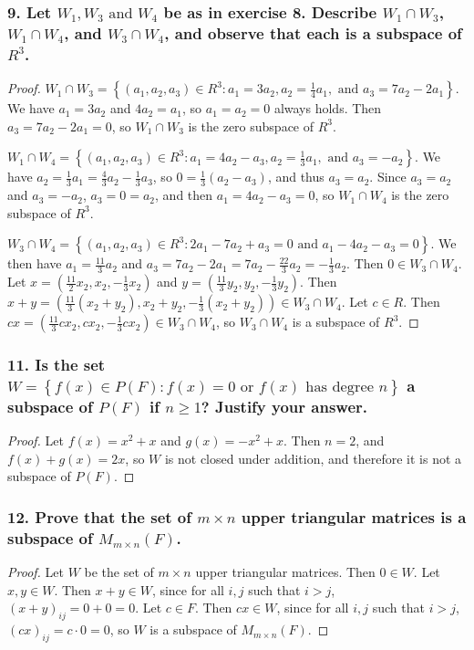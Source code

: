 \documentclass{article}
\begin{document}
\subsubsection*{9. Let $W_1, W_3 \text{ and } W_4$ be as in exercise 8. Describe $W_1 \cap W_3$, $W_1 \cap W_4$, and $W_3 \cap W_4$, and observe that each is a subspace of $R^3$.}
\begin{proof}
	$W_1 \cap W_3 = \left\{(a_1, a_2, a_3) \in R^3: a_1 = 3a_2, a_2 = \frac{1}{4}a_1,\text{ and } a_3 = 7a_2 - 2a_1\right\}$. We have $a_1 = 3a_2$ and $4a_2 = a_1$, so $a_1 = a_2 = 0$ always holds. Then $a_3 = 7a_2 - 2a_1 = 0$, so $W_1 \cap W_3$ is the zero subspace of $R^3$.
	
	$W_1 \cap W_4 = \left\{(a_1, a_2, a_3) \in R^3: a_1 = 4a_2-a_3, a_2 = \frac{1}{3}a_1, \text{ and } a_3 = -a_2\right\}$. We have $a_2 = \frac{1}{3}a_1 = \frac{4}{3}a_2 - \frac{1}{3}a_3$, so $0 = \frac{1}{3}(a_2 - a_3)$, and thus $a_3 = a_2$. Since $a_3 = a_2$ and $a_3 = -a_2$, $a_3 = 0 = a_2$, and then $a_1 = 4a_2 - a_3 = 0$, so $W_1 \cap W_4$ is the zero subspace of $R^3$.

	$W_3 \cap W_4 = \left\{(a_1, a_2, a_3) \in R^3: 2a_1 - 7a_2 + a_3 = 0 \text{ and } a_1 - 4a_2 -a_3 = 0\right\}$. We then have $a_1 = \frac{11}{3}a_2$ and $a_3 = 7a_2 - 2a_1 = 7a_2 - \frac{22}{3}a_2 = -\frac{1}{3}a_2$. Then $0 \in W_3 \cap W_4$. Let $x = (\frac{11}{2}x_2, x_2, -\frac{1}{3}x_2)$ and $y = (\frac{11}{3}y_2, y_2, -\frac{1}{3}y_2)$. Then $x + y = (\frac{11}{3}(x_2 + y_2), x_2 + y_2, -\frac{1}{3}(x_2 + y_2)) \in W_3 \cap W_4$. Let $c \in R$. Then $cx = (\frac{11}{3}cx_2, cx_2, -\frac{1}{3}cx_2) \in W_3 \cap W_4$, so $W_3\cap W_4$ is a subspace of $R^3$.
\end{proof}

\subsubsection*{11. Is the set $W = \left\{f(x) \in P(F): f(x) = 0 \text{ or } f(x) \text{ has degree }n\right\}$ a subspace of $P(F)$ if $n \ge 1$? Justify your answer.}
\begin{proof}
	Let $f(x) = x^2 + x$ and $g(x) = -x^2 + x$. Then $n = 2$, and $f(x) + g(x) = 2x$, so $W$ is not closed under addition, and therefore it is not a subspace of $P(F)$.
\end{proof}

\subsubsection*{12. Prove that the set of $m \times n$ upper triangular matrices is a subspace of $M_{m\times n}(F)$.}
\begin{proof}
	Let $W$ be the set of $m \times n$ upper triangular matrices. Then $0 \in W$. Let $x,y \in W$. Then $x + y \in W$, since for all $i,j$ such that $i > j$, $(x+y)_{ij} = 0 + 0 = 0$. Let $c \in F$. Then $cx \in W$, since for all $i,j$ such that $i > j$, $(cx)_{ij} = c \cdot 0 = 0$, so $W$ is a subspace of $M_{m\times n}(F)$.
\end{proof}
\end{document}
